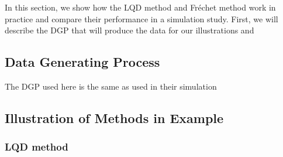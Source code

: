 In this section, we show how the LQD method and Fréchet method work in practice and
compare their performance in a simulation study. First, we will describe the DGP that
will produce the data for our illustrations and 

\subsection{Data Generating Process}
\label{sec:app_dgp}
The DGP used here is the same as \textcite{PetersenMüller2019} used in their simulation


\subsection{Illustration of Methods in Example}
\label{sec:app_illustration}

\subsubsection{LQD method}
\label{sec:app_lqd}

